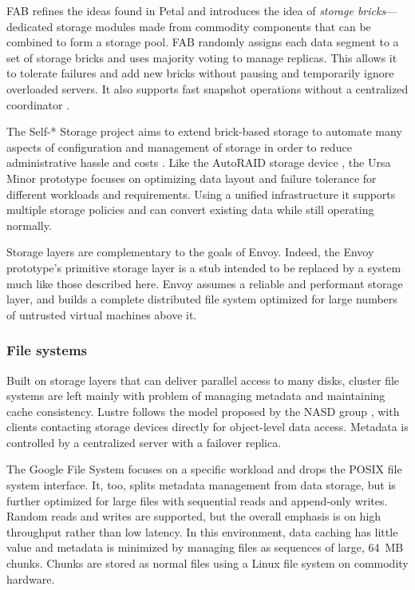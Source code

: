 FAB \cite{frolund,saito04} refines the ideas found in Petal and introduces the idea of \emph{storage bricks}---dedicated storage modules made from commodity components that can be combined to form a storage pool. FAB randomly assigns each data segment to a set of storage bricks and uses majority voting to manage replicas. This allows it to tolerate failures and add new bricks without pausing and temporarily ignore overloaded servers. It also supports fast snapshot operations without a centralized coordinator \cite{ji}.

The Self-* Storage project aims to extend brick-based storage to automate many aspects of configuration and management of storage in order to reduce administrative hassle and costs \cite{ganger03}. Like the AutoRAID storage device \cite{wilkes95}, the Ursa Minor prototype \cite{abd-el-malek} focuses on optimizing data layout and failure tolerance for different workloads and requirements. Using a unified infrastructure it supports multiple storage policies and can convert existing data while still operating normally.

Storage layers are complementary to the goals of Envoy. Indeed, the Envoy prototype's primitive storage layer is a stub intended to be replaced by a system much like those described here. Envoy assumes a reliable and performant storage layer, and builds a complete distributed file system optimized for large numbers of untrusted virtual machines above it.

\subsubsection{File systems}

Built on storage layers that can deliver parallel access to many disks, cluster file systems are left mainly with problem of managing metadata and maintaining cache consistency. Lustre \cite{lustre} follows the model proposed by the NASD group \cite{gibson98a}, with clients contacting storage devices directly for object-level data access. Metadata is controlled by a centralized server with a failover replica.

The Google File System \cite{ghemawat} focuses on a specific workload and drops the POSIX file system interface. It, too, splits metadata management from data storage, but is further optimized for large files with sequential reads and append-only writes. Random reads and writes are supported, but the overall emphasis is on high throughput rather than low latency. In this environment, data caching has little value and metadata is minimized by managing files as sequences of large, 64~MB chunks. Chunks are stored as normal files using a Linux file system on commodity hardware.

